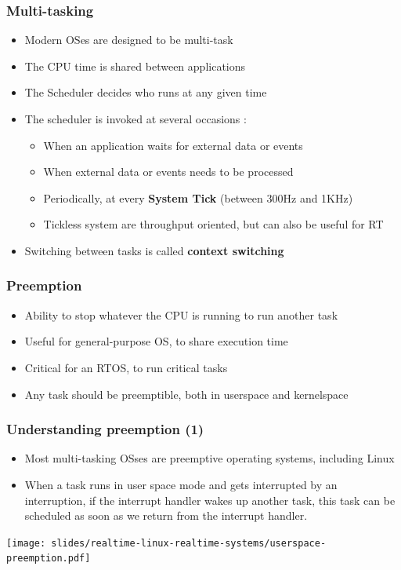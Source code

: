 \begin{frame}
  \frametitle{Multi-tasking}
	\begin{itemize}
		\item Modern OSes are designed to be multi-task
		\item The CPU time is shared between applications
		\item The Scheduler decides who runs at any given time
		\item The scheduler is invoked at several occasions :
			\begin{itemize}
				\item When an application waits for external data or events
				\item When external data or events needs to be processed
				\item Periodically, at every \textbf{System Tick} (between 300Hz and 1KHz)
				\item Tickless system are throughput oriented, but can also be useful for RT
			\end{itemize}
		\item Switching between tasks is called \textbf{context switching}
	\end{itemize}
\end{frame}

\begin{frame}
	\frametitle{Preemption}
	\begin{itemize}
		\item Ability to stop whatever the CPU is running to run another task
		\item Useful for general-purpose OS, to share execution time
		\item Critical for an RTOS, to run critical tasks
		\item Any task should be preemptible, both in userspace and kernelspace
	\end{itemize}
\end{frame}

\begin{frame}
  \frametitle{Understanding preemption (1)}
  \begin{itemize}
  \item Most multi-tasking OSses are preemptive operating systems, including Linux
  \item When a task runs in user space mode and gets interrupted by an
    interruption, if the interrupt handler wakes up another task, this
    task can be scheduled as soon as we return from the interrupt
    handler.
  \end{itemize}
  \begin{center}
    \texttt{[image: slides/realtime-linux-realtime-systems/userspace-preemption.pdf]}
  \end{center}
\end{frame}

